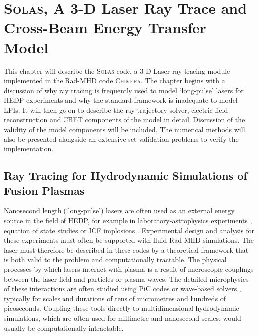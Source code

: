 \chapter{\textsc{Solas}, A 3-D Laser Ray Trace and Cross-Beam Energy Transfer Model} \label{chap:SOLAS}



This chapter will describe the \textsc{Solas} code, a 3-D Laser ray tracing module implemented in the \ac{Rad-MHD} code \textsc{Chimera}.
The chapter begins with a discussion of why ray tracing is frequently used to model `long-pulse' lasers for \ac{HEDP} experiments and why the standard framework is inadequate to model \ac{LPIs}.
It will then go on to describe the ray-trajectory solver, electric-field reconstruction and \ac{CBET} components of the model in detail.
Discussion of the validity of the model components will be included.
The numerical methods will also be presented alongside an extensive set validation problems to verify the implementation.


\section{Ray Tracing for Hydrodynamic Simulations of Fusion Plasmas}

Nanosecond length (`long-pulse') lasers are often used as an external energy source in the field of \ac{HEDP}, for example in laboratory-astrophysics experiments \cite{tzeferacos_laboratory_2018,fiuza_electron_2020,meinecke_strong_2022}, equation of state studies \cite{kritcher_measurement_2020,smith_ramp_2014} or \ac{ICF} implosions \cite{zylstra_burning_2022,slutz_high-gain_2012,williams_demonstration_2024}.
Experimental design and analysis for these experiments must often be supported with fluid \ac{Rad-MHD} simulations.
The laser must therefore be described in these codes by a theoretical framework that is both valid to the problem and computationally tractable.
The physical processes by which lasers interact with plasma is a result of microscopic couplings between the laser field and particles or plasma waves.
The detailed microphysics of these interactions are often studied using \ac{PiC} codes \cite{nguyen_cross-beam_2021} or wave-based solvers \cite{myatt_wave-based_2017}, typically for scales and durations of tens of micrometres and hundreds of picoseconds.
Coupling these tools directly to multidimensional hydrodynamic simulations, which are often used for millimetre and nanosecond scales, would usually be computationally intractable.


